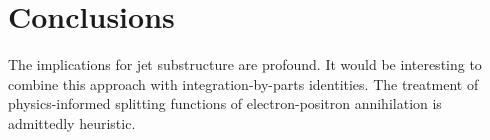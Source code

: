 \section{Conclusions}\label{sec:conclusions}

The implications for jet substructure are profound. It would be
interesting to combine this approach with integration-by-parts
identities. The treatment of physics-informed splitting functions of
electron-positron annihilation is admittedly heuristic.

